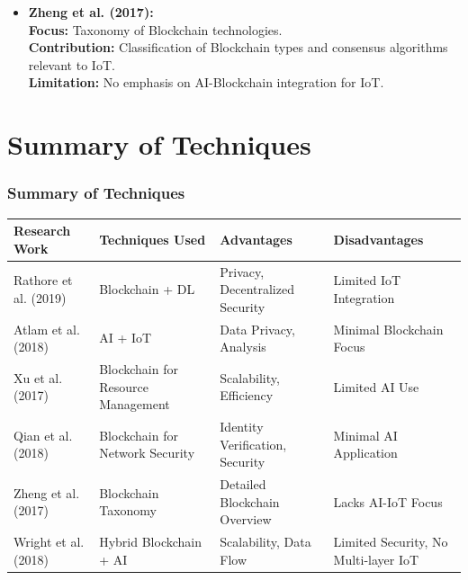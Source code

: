 \documentclass [xcolor=svgnames] {beamer}
\begin{document}
\begin{frame}[allowframebreaks]
\begin{itemize}
\item \textbf{Zheng et al. (2017):}\\
\textbf{Focus: }Taxonomy of Blockchain technologies.\\
\textbf{Contribution: }Classification of Blockchain types and consensus algorithms relevant to IoT.\\
\textbf{Limitation: }No emphasis on AI-Blockchain integration for IoT.
\end{itemize}

\end{frame}


\section{Summary of Techniques}
\begin{frame}
\scriptsize
\frametitle{Summary of Techniques}

\setlength{\tabcolsep}{5pt} %
\renewcommand{\arraystretch}{2} %

\begin{table}[h!]
\centering
\begin{tabular}{|>{\raggedright\arraybackslash}m{2cm}|>{\raggedright\arraybackslash}m{3cm}|>{\raggedright\arraybackslash}m{3cm}|>{\raggedright\arraybackslash}m{2cm}|}
\hline
\textbf{Research Work} & \textbf{Techniques Used} & \textbf{Advantages} & \textbf{Disadvantages} \\
\hline
Rathore et al. (2019) & Blockchain + DL & Privacy, Decentralized Security & Limited IoT Integration \\
\hline
Atlam et al. (2018) & AI + IoT & Data Privacy, Analysis & Minimal Blockchain Focus \\
\hline
Xu et al. (2017) & Blockchain for Resource Management & Scalability, Efficiency & Limited AI Use \\
\hline
Qian et al. (2018) & Blockchain for Network Security & Identity Verification, Security & Minimal AI Application \\
\hline
Zheng et al. (2017) & Blockchain Taxonomy & Detailed Blockchain Overview & Lacks AI-IoT Focus \\
\hline
Wright et al. (2018) & Hybrid Blockchain + AI & Scalability, Data Flow & Limited Security, No Multi-layer IoT \\
\hline
\end{tabular}
\label{table:litreview}
\end{table}

\end{frame}
\end{document}
